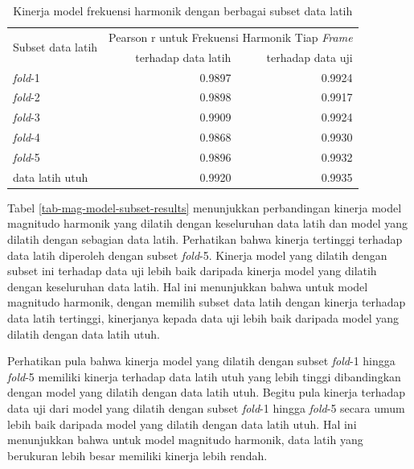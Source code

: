\begin{table}[htbp]
    \centering
    \caption{Kinerja model frekuensi harmonik dengan berbagai subset data latih}\label{tab-freq-model-subset-results}
    \begin{tabular}{ |l|r|r| } 
     \hline
     \multirow{2}{*}{Subset data latih} & \multicolumn{2}{l|}{Pearson r untuk Frekuensi Harmonik Tiap \textit{Frame}} \\
     \cline{2-3}
     & terhadap data latih & terhadap data uji \\\hline
	\textit{fold}-1      &0.9897  &0.9924\\\hline
	\textit{fold}-2      &0.9898  &0.9917\\\hline
	\textit{fold}-3      &0.9909  &0.9924\\\hline
	\textit{fold}-4      &0.9868  &0.9930\\\hline
	\textit{fold}-5      &0.9896  &0.9932\\\hline
	data latih utuh      &0.9920  &0.9935\\\hline
    \end{tabular}
\end{table}

Tabel \ref{tab-mag-model-subset-results} menunjukkan perbandingan kinerja model magnitudo harmonik yang dilatih dengan keseluruhan data latih dan model yang dilatih dengan sebagian data latih. Perhatikan bahwa kinerja tertinggi terhadap data latih diperoleh dengan subset \textit{fold}-5. Kinerja model yang dilatih dengan subset ini terhadap data uji lebih baik daripada kinerja model yang dilatih dengan keseluruhan data latih. Hal ini menunjukkan bahwa untuk model magnitudo harmonik, dengan memilih subset data latih dengan kinerja terhadap data latih tertinggi, kinerjanya kepada data uji lebih baik daripada model yang dilatih dengan data latih utuh. 

Perhatikan pula bahwa kinerja model yang dilatih dengan subset \textit{fold}-1 hingga \textit{fold}-5 memiliki kinerja terhadap data latih utuh yang lebih tinggi dibandingkan dengan model yang dilatih dengan data latih utuh. Begitu pula kinerja terhadap data uji dari model yang dilatih dengan subset \textit{fold}-1 hingga \textit{fold}-5 secara umum lebih baik daripada model yang dilatih dengan data latih utuh. Hal ini menunjukkan bahwa untuk model magnitudo harmonik, data latih yang berukuran lebih besar memiliki kinerja lebih rendah.


